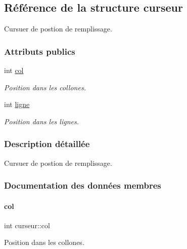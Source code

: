 \hypertarget{structcurseur}{}\subsection{Référence de la structure curseur}
\label{structcurseur}


Cursuer de postion de remplissage.  


\subsubsection*{Attributs publics}
\begin{DoxyCompactItemize}
\item 
int \hyperlink{structcurseur_a91caadb673d2eefc1b3d62bb3e5e8e41}{col}
\begin{DoxyCompactList}\small\item\em Position dans les collones. \end{DoxyCompactList}\item 
int \hyperlink{structcurseur_a31bcbe2907bdc7ef8981e2448fbde46b}{ligne}
\begin{DoxyCompactList}\small\item\em Position dans les lignes. \end{DoxyCompactList}\end{DoxyCompactItemize}


\subsubsection{Description détaillée}
Cursuer de postion de remplissage. 

\subsubsection{Documentation des données membres}
\mbox{\label{structcurseur_a91caadb673d2eefc1b3d62bb3e5e8e41}} 
\paragraph{\texorpdfstring{col}{col}}
{\footnotesize\ttfamily int curseur\+::col}



Position dans les collones. 

\mbox{\label{structcurseur_a31bcbe2907bdc7ef8981e2448fbde46b}} 
